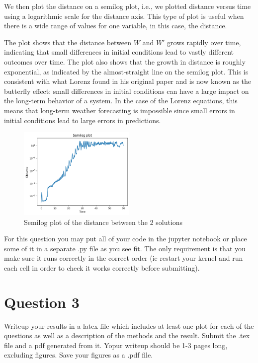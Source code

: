 \documentclass{article}
\begin{document}
\begin{enumerate}
We then plot the distance on a semilog plot, i.e., we plotted distance versus time using a logarithmic scale for the distance axis. This type of plot is useful when there is a wide range of values for one variable, in this case, the distance.

The plot shows that the distance between $W$ and $W'$ grows rapidly over time, indicating that small differences in initial conditions lead to vastly different outcomes over time. The plot also shows that the growth in distance is roughly exponential, as indicated by the almost-straight line on the semilog plot. This is consistent with what Lorenz found in his original paper and is now known as the butterfly effect: small differences in initial conditions can have a large impact on the long-term behavior of a system. In the case of the Lorenz equations, this means that long-term weather forecasting is impossible since small errors in initial conditions lead to large errors in predictions.


\begin{figure}[!h]
    \centering
    \includegraphics[width=0.5\textwidth]{sl.png}
    \caption{Semilog plot of the distance between the 2 solutions}
    \label{fig:4}
\end{figure}
\end{enumerate}

For this question you may put all of your code in the jupyter notebook or place some of it in a separate .py file as you see fit. The only requirement is that you make sure it runs correctly in the correct order (ie restart your kernel and run each cell in order to check it works correctly before submitting).





\section*{Question 3}

Writeup your results in a latex file which includes at least one plot for each of the questions as well as a description of the methods and the result. Submit the .tex file and a pdf generated from it. Yopur writeup should be 1-3 pages long, excluding figures. Save your figures as a .pdf file.
\end{document}
